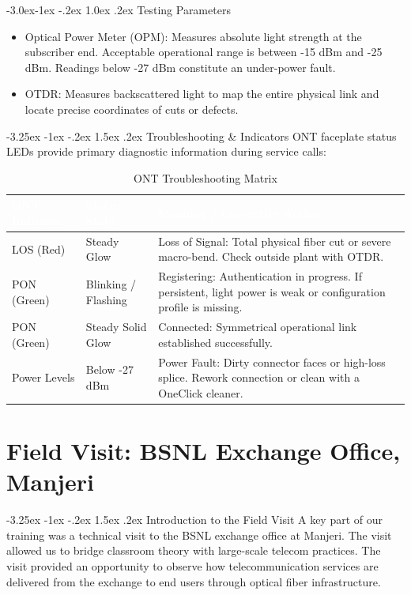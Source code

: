 \documentclass[11pt,a4paper]{report}
\makeatletter
\renewcommand{\section}{\@startsection{section}{1}{\z@}%
  {-3.25ex \@plus -1ex \@minus -.2ex}%
  {1.5ex \@plus.2ex}%
  {\normalfont\Large\bfseries\color{primaryColor}}}
\renewcommand{\subsection}{\@startsection{subsection}{2}{\z@}%
  {-3.0ex\@plus -1ex \@minus -.2ex}%
  {1.0ex \@plus .2ex}%
  {\normalfont\large\bfseries\color{secondaryColor}}}
\makeatother
\begin{document}
\subsection{Testing Parameters}
\begin{itemize}
  \item Optical Power Meter (OPM): Measures absolute light strength at the subscriber end. Acceptable operational range is between -15 dBm and -25 dBm. Readings below -27 dBm constitute an under-power fault.
  \item OTDR: Measures backscattered light to map the entire physical link and locate precise coordinates of cuts or defects.
\end{itemize}
\section{Troubleshooting \& Indicators}
ONT faceplate status LEDs provide primary diagnostic information during service calls:
\begin{table}[H]
\centering
\begin{tabularx}{\textwidth}{l l X}
\rowcolor{primaryColor}
\textcolor{white}{\textbf{ONT Indicator}} & \textcolor{white}{\textbf{Status State}} & \textcolor{white}{\textbf{Meaning / Corrective Action}} \\
\midrule
LOS (Red) & Steady Glow & Loss of Signal: Total physical fiber cut or severe macro-bend. Check outside plant with OTDR. \\
PON (Green) & Blinking / Flashing & Registering: Authentication in progress. If persistent, light power is weak or configuration profile is missing. \\
PON (Green) & Steady Solid Glow & Connected: Symmetrical operational link established successfully. \\
Power Levels & Below -27 dBm & Power Fault: Dirty connector faces or high-loss splice. Rework connection or clean with a OneClick cleaner. \\
\bottomrule
\end{tabularx}
\caption{ONT Troubleshooting Matrix}
\end{table}
\chapter{Field Visit: BSNL Exchange Office, Manjeri}
\section{Introduction to the Field Visit}
A key part of our training was a technical visit to the BSNL exchange office at Manjeri. The visit allowed us to bridge classroom theory with large-scale telecom practices. The visit provided an opportunity to observe how telecommunication services are delivered from the exchange to end users through optical fiber infrastructure.
\end{document}
